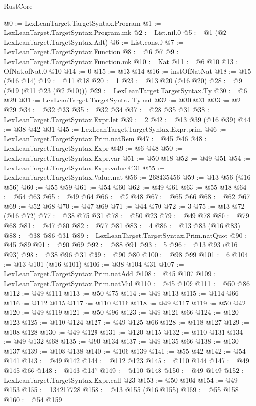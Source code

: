\begin{lexlean}{RustCore}
\begin{coremodule}
@0 := LexLeanTarget.TargetSyntax.Program
@1 := LexLeanTarget.TargetSyntax.Program.mk
@2 := List.nil.{0}
@5 := @1 (@2 LexLeanTarget.TargetSyntax.Adt)
@6 := List.cons.{0}
@7 := LexLeanTarget.TargetSyntax.Function
@8 := @6 @7
@9 := LexLeanTarget.TargetSyntax.Function.mk
@10 := Nat
@11 := @6 @10
@13 := OfNat.ofNat.{0} @10
@14 := 0
@15 := @13 @14
@16 := instOfNatNat
@18 := @15 (@16 @14)
@19 := @11 @18
@20 := 1
@23 := @13 @20 (@16 @20)
@28 := @9 (@19 (@11 @23 (@2 @10)))
@29 := LexLeanTarget.TargetSyntax.Ty
@30 := @6 @29
@31 := LexLeanTarget.TargetSyntax.Ty.nat
@32 := @30 @31
@33 := @2 @29
@34 := @32 @33
@35 := @32 @34
@37 := @28 @35 @31
@38 := LexLeanTarget.TargetSyntax.Expr.let
@39 := 2
@42 := @13 @39 (@16 @39)
@44 := @38 @42 @31
@45 := LexLeanTarget.TargetSyntax.Expr.prim
@46 := LexLeanTarget.TargetSyntax.Prim.natRem
@47 := @45 @46
@48 := LexLeanTarget.TargetSyntax.Expr
@49 := @6 @48
@50 := LexLeanTarget.TargetSyntax.Expr.var
@51 := @50 @18
@52 := @49 @51
@54 := LexLeanTarget.TargetSyntax.Expr.value @31
@55 := LexLeanTarget.TargetSyntax.Value.nat
@56 := 268435456
@59 := @13 @56 (@16 @56)
@60 := @55 @59
@61 := @54 @60
@62 := @49 @61
@63 := @55 @18
@64 := @54 @63
@65 := @49 @64
@66 := @2 @48
@67 := @65 @66
@68 := @62 @67
@69 := @52 @68
@70 := @47 @69
@71 := @44 @70
@72 := 3
@75 := @13 @72 (@16 @72)
@77 := @38 @75 @31
@78 := @50 @23
@79 := @49 @78
@80 := @79 @68
@81 := @47 @80
@82 := @77 @81
@83 := 4
@86 := @13 @83 (@16 @83)
@88 := @38 @86 @31
@89 := LexLeanTarget.TargetSyntax.Prim.natQuot
@90 := @45 @89
@91 := @90 @69
@92 := @88 @91
@93 := 5
@96 := @13 @93 (@16 @93)
@98 := @38 @96 @31
@99 := @90 @80
@100 := @98 @99
@101 := 6
@104 := @13 @101 (@16 @101)
@106 := @38 @104 @31
@107 := LexLeanTarget.TargetSyntax.Prim.natAdd
@108 := @45 @107
@109 := LexLeanTarget.TargetSyntax.Prim.natMul
@110 := @45 @109
@111 := @50 @86
@112 := @49 @111
@113 := @50 @75
@114 := @49 @113
@115 := @114 @66
@116 := @112 @115
@117 := @110 @116
@118 := @49 @117
@119 := @50 @42
@120 := @49 @119
@121 := @50 @96
@123 := @49 @121 @66
@124 := @120 @123
@125 := @110 @124
@127 := @49 @125 @66
@128 := @118 @127
@129 := @108 @128
@130 := @49 @129
@131 := @120 @115
@132 := @110 @131
@134 := @49 @132 @68
@135 := @90 @134
@137 := @49 @135 @66
@138 := @130 @137
@139 := @108 @138
@140 := @106 @139
@141 := @55 @42
@142 := @54 @141
@143 := @49 @142
@144 := @112 @123
@145 := @110 @144
@147 := @49 @145 @66
@148 := @143 @147
@149 := @110 @148
@150 := @49 @149
@152 := LexLeanTarget.TargetSyntax.Expr.call @23
@153 := @50 @104
@154 := @49 @153
@155 := 134217728
@158 := @13 @155 (@16 @155)
@159 := @55 @158
@160 := @54 @159

\end{coremodule}
\end{lexlean}
